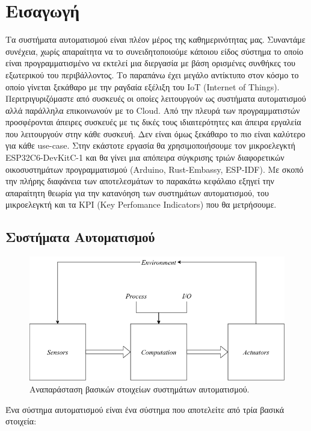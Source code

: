 \section{Εισαγωγή}

Τα συστήματα αυτοματισμού είναι πλέον μέρος της καθημερινότητας μας. Συναντάμε συνέχεια, χωρίς
απαραίτητα να το συνειδητοποιούμε κάποιου είδος σύστημα το οποίο είναι προγραμματισμένο να εκτελεί
μια διεργασία με βάση ορισμένες συνθήκες του εξωτερικού του περιβάλλοντος. Το παραπάνω έχει μεγάλο
αντίκτυπο στον κόσμο το οποίο γίνεται ξεκάθαρο με την ραγδαία εξέλιξη του IoT (Internet of Things).
Περιτριγυριζόμαστε από συσκευές οι οποίες λειτουργούν ως συστήματα αυτοματισμού αλλά παράλληλα
επικοινωνούν με το Cloud. Από την πλευρά των προγραμματιστών προσφέρονται άπειρες συσκευές με τις
δικές τους ιδιαιτερότητες και άπειρα εργαλεία που λειτουργούν στην κάθε συσκευή.
Δεν είναι όμως ξεκάθαρο το πιο είναι καλύτερο για κάθε use-case. Στην εκάστοτε
εργασία θα χρησιμοποιήσουμε τον μικροελεγκτή ESP32C6-DevKitC-1 και θα γίνει μια απόπειρα
σύγκρισης τριών διαφορετικών οικοσυστημάτων προγραμματισμού (Arduino, Rust-Embassy, ESP-IDF).
Με σκοπό την πλήρης διαφάνεια των αποτελεσμάτων το παρακάτω κεφάλαιο εξηγεί την απαραίτητη
θεωρία για την κατανόηση των συστημάτων αυτοματισμού, του μικροελεγκτή και τα KPI (Key
Perfomance Indicators) που θα μετρήσουμε.

\subsection{Συστήματα Αυτοματισμού}

\begin{figure}[h!]
\centering
\includegraphics[scale=0.4]{images/introduction/as_elements.png}
\caption{Αναπαράσταση βασικών στοιχείων συστημάτων αυτοματισμού.}
 \label{fig:as_elements}
\end{figure}

Ένα σύστημα αυτοματισμού είναι ένα σύστημα που αποτελείτε από τρία
βασικά στοιχεία:

